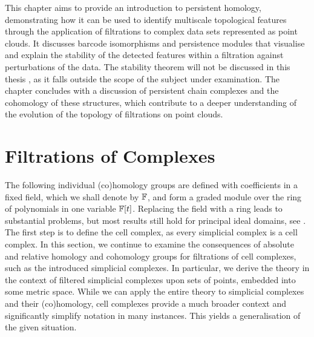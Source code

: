 \label{PersistentHomology}
This chapter aims to provide an introduction to persistent homology, demonstrating how it can be used to identify multiscale topological features through the application of filtrations to complex data sets represented as point clouds. It discusses barcode isomorphisms and persistence modules that visualise and explain the stability of the detected features within a filtration against perturbations of the data. 
The stability theorem will not be discussed in this thesis \cite[Theorem 4.20]{chazal2016structure}, as it falls outside the scope of the subject under examination. The chapter concludes with a discussion of persistent chain complexes and the cohomology of these structures, which contribute to a deeper understanding of the evolution of the topology of filtrations on point clouds.

\section{Filtrations of Complexes}
\label{FiltrationsofComplexes}
The following individual (co)homology groups are defined with coefficients in a fixed field, which we shall denote by ${\mathbb{F}}$, and form a graded module over the ring of polynomials in one variable ${\mathbb{F}}[t]$. Replacing the field with a ring leads to substantial problems, but most results still hold for principal ideal domains, see \cite[Theorem 2.1, \S 3.1]{zomorodian2004computing}. The first step is to define the cell complex, as every simplicial complex is a cell complex. In this section, we continue to examine the consequences of absolute and relative homology and cohomology groups for filtrations of cell complexes, such as the introduced simplicial complexes. In particular, we derive the theory in the context of filtered simplicial complexes upon sets of points, embedded into some metric space. While we can apply the entire theory to simplicial complexes and their (co)homology, cell complexes provide a much broader context and significantly simplify notation in many instances. This yields a generalisation of the given situation.

